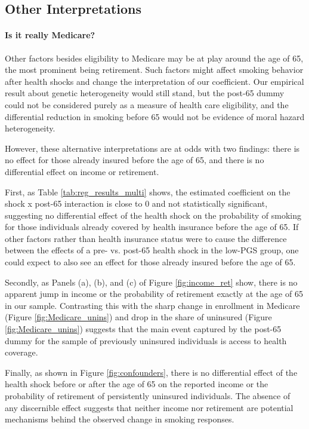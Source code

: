 \documentclass[11pt]{article}
\begin{document}
\subsection{Other Interpretations}\label{sec:interpret}

\paragraph{Is it really Medicare?}
Other factors besides eligibility to Medicare may be at play around the age of 65, the most prominent being retirement.
Such factors might affect smoking behavior after health shocks and change the interpretation of our coefficient.
Our empirical result about genetic heterogeneity would still stand, but the post-65 dummy could not be considered purely as a measure of health care eligibility, and the differential reduction in smoking before 65 would not be evidence of moral hazard heterogeneity.

However, these alternative interpretations are at odds with two findings: there is no effect for those already insured before the age of 65, and there is no differential effect on income or retirement.

First, as Table \ref{tab:reg_results_multi} shows, the estimated coefficient on the \textsf{shock x post-65} interaction is close to 0 and not statistically significant, suggesting no differential effect of the health shock on the probability of smoking for those individuals already covered by health insurance before the age of 65.
If other factors rather than health insurance status were to cause the difference between the effects of a pre- vs. post-65 health shock in the low-PGS group, one could expect to also see an effect for those already insured before the age of 65.

Secondly, as Panels (a), (b), and (c) of Figure \ref{fig:income_ret} show, there is no apparent jump in income or the probability of retirement exactly at the age of 65 in our sample.
Contrasting this with the sharp change in enrollment in Medicare (Figure \ref{fig:Medicare_unins}) and drop in the share of uninsured (Figure \ref{fig:Medicare_unins}) suggests that the main event captured by the post-65 dummy for the sample of previously uninsured individuals is access to health coverage.

Finally, as shown in Figure \ref{fig:confounders}, there is no differential effect of the health shock before or after the age of 65 on the reported income or the probability of retirement of persistently uninsured individuals.
The absence of any discernible effect suggests that neither income nor retirement are potential mechanisms behind the observed change in smoking responses.
\end{document}
